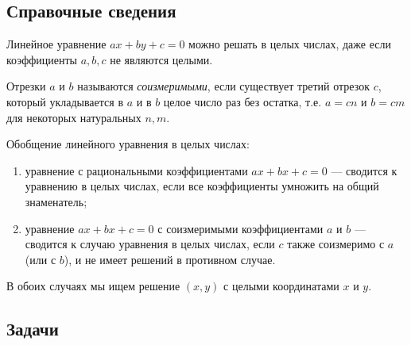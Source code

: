 \begin{enumerate}
\end{enumerate}

\subsection*{Справочные сведения}

Линейное уравнение $ax+by+c=0$ можно решать в целых числах, даже если коэффициенты $a,b,c$ не являются целыми.

Отрезки $a$ и $b$ называются \textit{соизмеримыми}, если существует третий отрезок $c$, который укладывается в $a$ и в $b$ целое число раз без остатка, т.е. $a=cn$ и $b=cm$ для некоторых натуральных $n,m$.

Обобщение линейного уравнения в целых числах:
\begin{enumerate}
\item уравнение с рациональными коэффициентами $ax+bx+c=0$ --- сводится к уравнению в целых числах, если все коэффициенты умножить на общий знаменатель;
\item уравнение $ax+bx+c=0$ с соизмеримыми коэффициентами $a$ и $b$ --- сводится к случаю уравнения в целых числах, если $c$ также соизмеримо с $a$ (или с $b$), и не имеет решений в противном случае.
\end{enumerate}
В обоих случаях мы ищем решение $(x,y)$ с целыми координатами $x$ и $y$.


\subsection*{Задачи}

